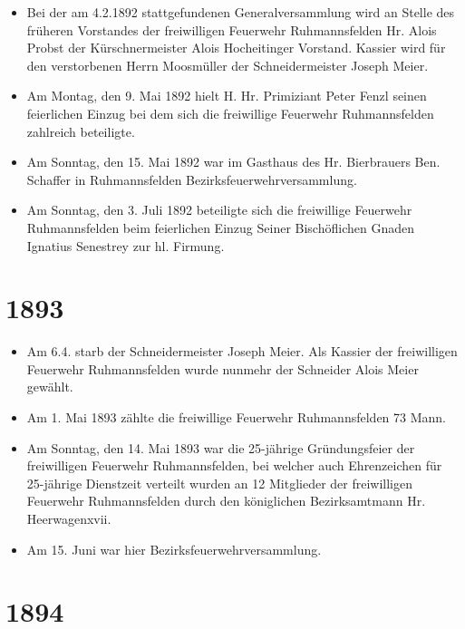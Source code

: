 \documentclass[12pt,a4paper]{book}
\begin{document}
\begin{itemize}
\item Bei der am 4.2.1892 stattgefundenen Generalversammlung wird an Stelle des
früheren Vorstandes der freiwilligen Feuerwehr Ruhmannsfelden Hr. Alois Probst
der Kürschnermeister Alois Hocheitinger Vorstand. Kassier wird für den
verstorbenen Herrn Moosmüller der Schneidermeister Joseph Meier.

\item Am Montag, den 9. Mai 1892 hielt H. Hr. Primiziant Peter Fenzl seinen
feierlichen Einzug bei dem sich die freiwillige Feuerwehr Ruhmannsfelden
zahlreich beteiligte.

\item Am Sonntag, den 15. Mai 1892 war im Gasthaus des Hr. Bierbrauers Ben.
Schaffer in Ruhmannsfelden Bezirksfeuerwehrversammlung.

\item Am Sonntag, den 3. Juli 1892 beteiligte sich die freiwillige Feuerwehr
Ruhmannsfelden beim feierlichen Einzug Seiner Bischöflichen Gnaden Ignatius
Senestrey zur hl. Firmung.
\end{itemize}

\section*{1893}

\begin{itemize}
\item Am 6.4. starb der Schneidermeister Joseph Meier. Als Kassier der
freiwilligen Feuerwehr Ruhmannsfelden wurde nunmehr der Schneider Alois Meier
gewählt.

\item Am 1. Mai 1893 zählte die freiwillige Feuerwehr Ruhmannsfelden 73 Mann.

\item Am Sonntag, den 14. Mai 1893 war die 25-jährige Gründungsfeier der
freiwilligen Feuerwehr Ruhmannsfelden, bei welcher auch Ehrenzeichen für
25-jährige Dienstzeit verteilt wurden an 12 Mitglieder der freiwilligen
Feuerwehr Ruhmannsfelden durch den königlichen Bezirksamtmann Hr. Heerwagenxvii.

\item Am 15. Juni war hier Bezirksfeuerwehrversammlung.
\end{itemize}

\section*{1894}
\end{document}
